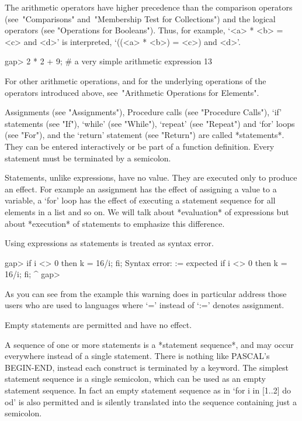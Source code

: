 {The arithmetic operators have higher precedence than the comparison
operators (see~"Comparisons" and~"Membership Test for Collections")
and the logical operators (see
"Operations for Booleans"). Thus, for example, `<a> * <b> = <c> and
<d>' is interpreted, `((<a> * <b>) = <c>) and <d>'.

\beginexample
gap> 2 * 2 + 9;  # a very simple arithmetic expression
13
\endexample

For other arithmetic operations, and for the underlying operations of
the operators introduced above, see~"Arithmetic Operations for Elements".


Assignments (see "Assignments"), Procedure calls (see "Procedure Calls"),
`if' statements (see "If"), `while' (see "While"), `repeat'  (see
"Repeat") and `for' loops (see "For"), and the `return' statement (see
"Return") are called *statements*. They can be entered interactively or be
part of a function definition. Every statement must be terminated by a
semicolon.

Statements, unlike expressions, have no value. They are executed only to
produce an effect. For example an assignment has the effect of assigning
a  value to a variable, a `for' loop  has the effect of executing a
statement sequence for all elements in a list and so on. We will talk
about *evaluation* of expressions but about *execution* of statements to
emphasize this difference.

Using expressions as statements is treated as syntax error.

\begintt
gap> if i <> 0 then k = 16/i; fi;
Syntax error: := expected
if i <> 0 then k = 16/i; fi;
                 ^
gap>
\endtt

As you can see from the example this warning does in particular address
those users who are used to languages where `=' instead of `:=' denotes
assignment.

Empty statements are permitted and have no effect.

A sequence of one or more statements is a *statement sequence*, and may
occur everywhere instead of a single statement. There is nothing like
PASCAL's BEGIN-END, instead each construct is terminated by a keyword.
The simplest statement sequence is a single semicolon, which can be
used as an empty statement sequence. In fact an empty statement
sequence as in `for i in [1..2] do od' is also permitted and is
silently translated into the sequence containing just a semicolon.

}
